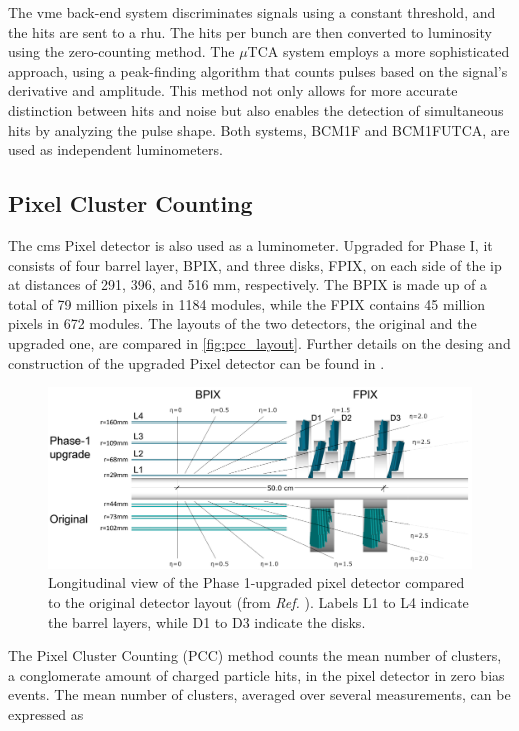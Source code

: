 The \acrshort{vme} back-end system discriminates signals using a constant threshold, and the hits are sent to a \acrfull{rhu}. The hits per bunch are then converted to luminosity using the zero-counting method. The $\mu$TCA system employs a more sophisticated approach, using a peak-finding algorithm that counts pulses based on the signal's derivative and amplitude. This method not only allows for more accurate distinction between hits and noise but also enables the detection of simultaneous hits by analyzing the pulse shape. Both systems, BCM1F and BCM1FUTCA, are used as independent luminometers.

\subsection{Pixel Cluster Counting}

The \acrshort{cms} Pixel detector is also used as a luminometer. Upgraded for Phase I, it consists of four barrel layer, BPIX, and three disks, FPIX, on each side of the \acrshort{ip} at distances of 291, 396, and 516 mm, respectively. The BPIX is made up of a total of 79 million pixels in 1184 modules, while the FPIX contains 45 million pixels in 672 modules. The layouts of the two detectors, the original and the upgraded one, are compared in \autoref{fig:pcc_layout}. Further details on the desing and construction of the upgraded Pixel detector can be found in \cite{tracker2020cms}.

\begin{figure}[h]
\centering
\includegraphics[width=\textwidth]{images/assets/pcc_upgrade.png}
\caption[Upgraded pixel detector]{Longitudinal view of the Phase 1-upgraded pixel detector compared to the original detector layout (from \textit{Ref.} \cite{tracker2020cms}). Labels L1 to L4 indicate the barrel layers, while D1 to D3 indicate the disks.}
\label{fig:pcc_layout}
\end{figure}

The Pixel Cluster Counting (PCC) method counts the mean number of clusters, a conglomerate amount of charged particle hits, in the pixel detector in zero bias events. The mean number of clusters, averaged over several measurements, can be expressed as


